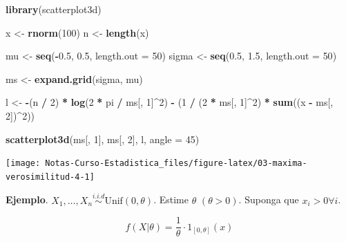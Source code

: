 \documentclass[
  12pt,
]{book}
\newenvironment{Shaded}{\begin{snugshade}}{\end{snugshade}}
\newcommand{\DataTypeTok}[1]{\textcolor[rgb]{0.13,0.29,0.53}{#1}}
\newcommand{\DecValTok}[1]{\textcolor[rgb]{0.00,0.00,0.81}{#1}}
\newcommand{\FloatTok}[1]{\textcolor[rgb]{0.00,0.00,0.81}{#1}}
\newcommand{\KeywordTok}[1]{\textcolor[rgb]{0.13,0.29,0.53}{\textbf{#1}}}
\newcommand{\NormalTok}[1]{#1}
\newcommand{\OperatorTok}[1]{\textcolor[rgb]{0.81,0.36,0.00}{\textbf{#1}}}
\newcommand{\StringTok}[1]{\textcolor[rgb]{0.31,0.60,0.02}{#1}}
\begin{document}
\begin{Shaded}
\begin{Highlighting}[]
\KeywordTok{library}\NormalTok{(scatterplot3d)}

\NormalTok{x \textless{}{-}}\StringTok{ }\KeywordTok{rnorm}\NormalTok{(}\DecValTok{100}\NormalTok{)}
\NormalTok{n \textless{}{-}}\StringTok{ }\KeywordTok{length}\NormalTok{(x)}

\NormalTok{mu \textless{}{-}}\StringTok{ }\KeywordTok{seq}\NormalTok{(}\OperatorTok{{-}}\FloatTok{0.5}\NormalTok{, }\FloatTok{0.5}\NormalTok{, }\DataTypeTok{length.out =} \DecValTok{50}\NormalTok{)}
\NormalTok{sigma \textless{}{-}}\StringTok{ }\KeywordTok{seq}\NormalTok{(}\FloatTok{0.5}\NormalTok{, }\FloatTok{1.5}\NormalTok{, }\DataTypeTok{length.out =} \DecValTok{50}\NormalTok{)}

\NormalTok{ms \textless{}{-}}\StringTok{ }\KeywordTok{expand.grid}\NormalTok{(sigma, mu)}

\NormalTok{l \textless{}{-}}\StringTok{ }\OperatorTok{{-}}\NormalTok{(n }\OperatorTok{/}\StringTok{ }\DecValTok{2}\NormalTok{) }\OperatorTok{*}\StringTok{ }\KeywordTok{log}\NormalTok{(}\DecValTok{2} \OperatorTok{*}\StringTok{ }\NormalTok{pi }\OperatorTok{/}\StringTok{ }\NormalTok{ms[, }\DecValTok{1}\NormalTok{]}\OperatorTok{\^{}}\DecValTok{2}\NormalTok{) }\OperatorTok{{-}}\StringTok{ }\NormalTok{(}\DecValTok{1} \OperatorTok{/}\StringTok{ }\NormalTok{(}\DecValTok{2} \OperatorTok{*}\StringTok{ }\NormalTok{ms[, }\DecValTok{1}\NormalTok{]}\OperatorTok{\^{}}\DecValTok{2}\NormalTok{) }\OperatorTok{*}\StringTok{ }\KeywordTok{sum}\NormalTok{((x }\OperatorTok{{-}}\StringTok{ }\NormalTok{ms[, }\DecValTok{2}\NormalTok{])}\OperatorTok{\^{}}\DecValTok{2}\NormalTok{))}

\KeywordTok{scatterplot3d}\NormalTok{(ms[, }\DecValTok{1}\NormalTok{], ms[, }\DecValTok{2}\NormalTok{], l, }\DataTypeTok{angle =} \DecValTok{45}\NormalTok{)}
\end{Highlighting}
\end{Shaded}

\begin{center}\texttt{[image: Notas-Curso-Estadistica\_files/figure-latex/03-maxima-verosimilitud-4-1]} \end{center}

\textbf{Ejemplo}. \(X_1,\dots, X_n \stackrel{i.i.d}{\sim} \text{Unif}(0, \theta)\). Estime \(\theta\) \((\theta > 0)\). Suponga que \(x_i>0 \forall i\).

\[f(X|\theta) = \dfrac 1\theta \cdot 1_{[0,\theta]}(x)\]
\end{document}
